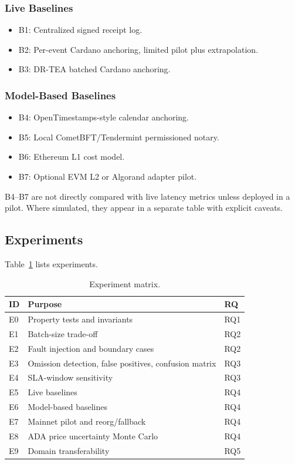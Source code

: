 \documentclass[journal]{IEEEtran}
\begin{document}
\subsubsection{Live Baselines}
\begin{itemize}[nosep,leftmargin=2em]
    \item B1: Centralized signed receipt log.
    \item B2: Per-event Cardano anchoring, limited pilot plus extrapolation.
    \item B3: DR-TEA batched Cardano anchoring.
\end{itemize}

\subsubsection{Model-Based Baselines}
\begin{itemize}[nosep,leftmargin=2em]
    \item B4: OpenTimestamps-style calendar anchoring.
    \item B5: Local CometBFT/Tendermint permissioned notary.
    \item B6: Ethereum L1 cost model.
    \item B7: Optional EVM L2 or Algorand adapter pilot.
\end{itemize}

B4--B7 are not directly compared with live latency metrics unless deployed in a pilot. Where simulated, they appear in a separate table with explicit caveats.

\subsection{Experiments}
Table~\ref{tab:experiments} lists experiments.

\begin{table}[!t]
\centering
\caption{Experiment matrix.}
\label{tab:experiments}
\renewcommand{\arraystretch}{1.1}
\small
\begin{tabular}{@{}p{1.2cm} p{4.8cm} p{1.8cm}@{}}
\toprule
\textbf{ID} & \textbf{Purpose} & \textbf{RQ} \\
\midrule
E0 & Property tests and invariants & RQ1 \\
E1 & Batch-size trade-off & RQ2 \\
E2 & Fault injection and boundary cases & RQ2 \\
E3 & Omission detection, false positives, confusion matrix & RQ3 \\
E4 & SLA-window sensitivity & RQ3 \\
E5 & Live baselines & RQ4 \\
E6 & Model-based baselines & RQ4 \\
E7 & Mainnet pilot and reorg/fallback & RQ4 \\
E8 & ADA price uncertainty Monte Carlo & RQ4 \\
E9 & Domain transferability & RQ5 \\
\bottomrule
\end{tabular}
\end{table}
\end{document}
